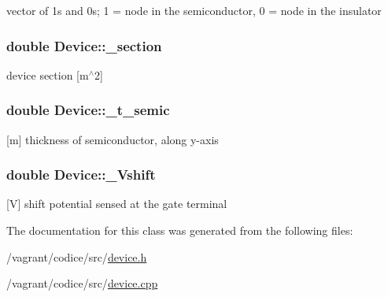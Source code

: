 vector of 1s and 0s; 1 = node in the semiconductor, 0 = node in the insulator \hypertarget{classDevice_ae1288d49aa397c5889c8c9920598da11}{
\subsubsection[{\-\_\-section}]{\setlength{\rightskip}{0pt plus 5cm}double Device\-::\-\_\-section\hspace{0.3cm}{\ttfamily [protected]}}}\label{classDevice_ae1288d49aa397c5889c8c9920598da11}
device section \mbox{[}m$^\wedge$2\mbox{]} \hypertarget{classDevice_abee50855aea21bb07d1f3ea055821b06}{
\subsubsection[{\-\_\-t\-\_\-semic}]{\setlength{\rightskip}{0pt plus 5cm}double Device\-::\-\_\-t\-\_\-semic\hspace{0.3cm}{\ttfamily [protected]}}}\label{classDevice_abee50855aea21bb07d1f3ea055821b06}
\mbox{[}m\mbox{]} thickness of semiconductor, along y-\/axis \hypertarget{classDevice_ac69abf458fa89193ff89961d2708ec7c}{
\subsubsection[{\-\_\-\-Vshift}]{\setlength{\rightskip}{0pt plus 5cm}double Device\-::\-\_\-\-Vshift\hspace{0.3cm}{\ttfamily [protected]}}}\label{classDevice_ac69abf458fa89193ff89961d2708ec7c}
\mbox{[}V\mbox{]} shift potential sensed at the gate terminal 

The documentation for this class was generated from the following files\-:\begin{DoxyCompactItemize}
\item 
/vagrant/codice/src/\hyperlink{device_8h}{device.\-h}\item 
/vagrant/codice/src/\hyperlink{device_8cpp}{device.\-cpp}\end{DoxyCompactItemize}
